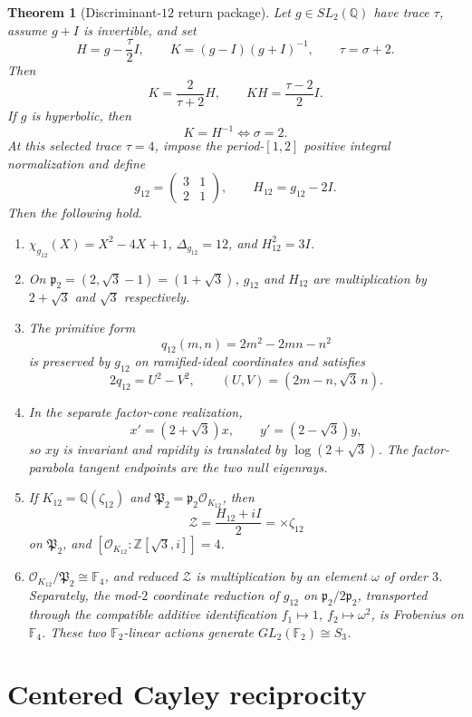 \documentclass[11pt]{article}
\newtheorem{theorem}{Theorem}[section]
\theoremstyle{remark}
\newcommand{\Q}{\mathbb Q}
\newcommand{\Z}{\mathbb Z}
\newcommand{\F}{\mathbb F}
\newcommand{\OO}{\mathcal O}
\begin{document}
\begin{theorem}[Discriminant-$12$ return package]
\label{thm:main}
Let $g\in SL_2(\Q)$ have trace $\tau$, assume $g+I$ is invertible, and set
\[
H=g-\frac\tau2I,
\qquad K=(g-I)(g+I)^{-1},
\qquad \tau=\sigma+2.
\]
Then
\[
K=\frac{2}{\tau+2}H,
\qquad KH=\frac{\tau-2}{2}I.
\]
If $g$ is hyperbolic, then
\[
K=H^{-1}\iff\sigma=2.
\]
At this selected trace $\tau=4$, impose the period-$[1,2]$ positive integral
normalization and define
\[
g_{12}=\begin{pmatrix}3&1\\2&1\end{pmatrix},
\qquad
H_{12}=g_{12}-2I.
\]
Then the following hold.
\begin{enumerate}[label=(\roman*)]
\item $\chi_{g_{12}}(X)=X^2-4X+1$, $\Delta_{g_{12}}=12$, and
$H_{12}^2=3I$.
\item On $\mathfrak p_2=(2,\sqrt3-1)=(1+\sqrt3)$, $g_{12}$ and $H_{12}$
are multiplication by $2+\sqrt3$ and $\sqrt3$ respectively.
\item The primitive form
\[
q_{12}(m,n)=2m^2-2mn-n^2
\]
is preserved by $g_{12}$ on ramified-ideal coordinates and satisfies
\[
2q_{12}=U^2-V^2,
\qquad (U,V)=(2m-n,\sqrt3\,n).
\]
\item In the separate factor-cone realization,
\[
x'=(2+\sqrt3)x,
\qquad y'=(2-\sqrt3)y,
\]
so $xy$ is invariant and rapidity is translated by $\log(2+\sqrt3)$.
The factor-parabola tangent endpoints are the two null eigenrays.
\item If $K_{12}=\Q(\zeta_{12})$ and
$\mathfrak P_2=\mathfrak p_2\OO_{K_{12}}$, then
\[
\mathcal Z=\frac{H_{12}+iI}{2}=\times\zeta_{12}
\]
on $\mathfrak P_2$, and
$[\OO_{K_{12}}:\Z[\sqrt3,i]]=4$.
\item $\OO_{K_{12}}/\mathfrak P_2\cong\F_4$, and reduced $\mathcal Z$ is
multiplication by an element $\omega$ of order $3$.  Separately, the mod-$2$
coordinate reduction of $g_{12}$ on $\mathfrak p_2/2\mathfrak p_2$, transported
through the compatible additive identification
$f_1\mapsto1$, $f_2\mapsto\omega^2$, is Frobenius on $\F_4$.  These two
$\F_2$-linear actions generate $GL_2(\F_2)\cong S_3$.
\end{enumerate}
\end{theorem}

\section{Centered Cayley reciprocity}
\end{document}

